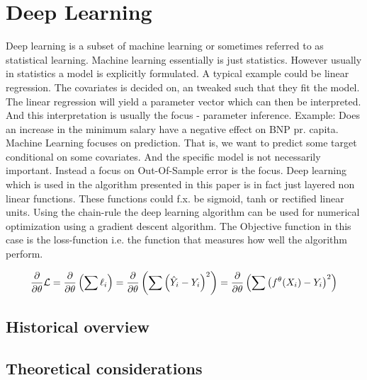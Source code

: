 \section{Deep Learning}

Deep learning is a subset of machine learning or sometimes referred to as statistical learning. Machine learning essentially is just statistics. However usually in statistics a model is explicitly formulated. A typical example could be linear regression. The covariates is decided on, an tweaked such that they fit the model. The linear regression will yield a parameter vector which can then be interpreted. And this interpretation is usually the focus - parameter inference. Example: Does an increase in the minimum salary have a negative effect on BNP pr. capita. Machine Learning focuses on prediction. That is, we want to predict some target conditional on some covariates. And the specific model is not necessarily important. Instead a focus on Out-Of-Sample error is the focus. Deep learning which is used in the algorithm presented in this paper is in fact just layered non linear functions. These functions could f.x.  be sigmoid, tanh or rectified linear units. Using the chain-rule the deep learning algorithm can be used for numerical optimization using a gradient descent algorithm. The Objective function in this case is the loss-function i.e. the function that measures how well the algorithm perform.

\begin{equation}
    \frac{\partial}{\partial\theta} \mathcal{L} = \frac{\partial}{\partial\theta} \left( \sum \ell_i \right) = \frac{\partial}{\partial\theta} \left( \sum \left( \hat{Y}_i  - Y_i \right)^2 \right) = \frac{\partial}{\partial\theta} \left( \sum \left( f^{\theta}(X_i)  - Y_i \right)^2 \right)
\end{equation}

\subsection{Historical overview}

\subsection{Theoretical considerations}




